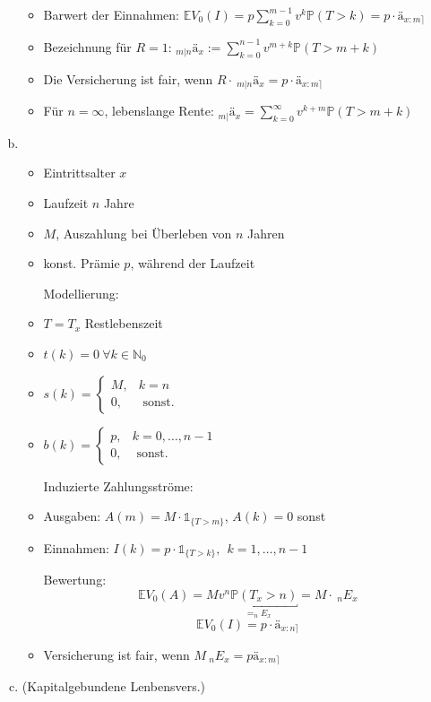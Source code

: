 \begin{enumerate}[(a)]
\begin{itemize}
		\item Barwert der Einnahmen: $\mathds{E}V_0(I)=p\sum_{k=0}^{m-1}v^k \mathds{P}(T>k)=p\cdot ä_{x:m\rceil}$ 
		\item Bezeichnung für $R=1$: $_{m|n}ä_x:=\sum_{k=0}^{n-1}v^{m+k}\mathds{P}(T>m+k)$
		\item Die Versicherung ist fair, wenn $R\cdot~ _{m|n}ä_x=p\cdot ä_{x:m\rceil}$
		\item Für $n=\infty$, lebenslange Rente: $_{m|}ä_x=\sum_{k=0}^{\infty}v^{k+m}\mathds{P}(T>m+k)$
	\end{itemize}
	\item {}\\
	\begin{itemize}
		\item Eintrittsalter $x$
		\item Laufzeit $n$ Jahre
		\item {} $M$, Auszahlung bei Überleben von $n$ Jahren
		\item konst. Prämie $p$, während der Laufzeit
		\item[Modellierung:]
		\item $T=T_x$ Restlebenszeit
		\item $t(k)=0~\forall k\in \mathds{N}_0$
		\item $s(k)=\left\{\begin{array}{cl} M, & k=n\\ 0, & \text{ sonst.} \end{array}\right.$
		\item $b(k)=\left\{\begin{array}{cl} p, & k=0,\dots,n-1 \\ 0, & \text{ sonst.}	\end{array}\right.$
		\item[Induzierte Zahlungsströme:]
		\item Ausgaben: $A(m)=M\cdot \mathbb{1}_{\{T>m\}}$, $A(k)=0$ sonst
		\item Einnahmen: $I(k)=p\cdot \mathbb{1}_{\{T>k\}},~~k=1,\dots,n-1$
		\item[Bewertung:]
		\[
		\mathds{E}V_0(A)= M \underbracket{v^n \mathds{P}(T_x>n)}_{= _nE_x}=M\cdot~_nE_x 
		\]		
		\[
		\mathds{E}V_0(I)= p\cdot ä_{x:n\rceil} 
		\]
		\item Versicherung ist fair, wenn $ M~_nE_x=pä_{x:m\rceil}$
	\end{itemize}
	\item {} (Kapitalgebundene Lenbensvers.)\\
	

\end{enumerate}
